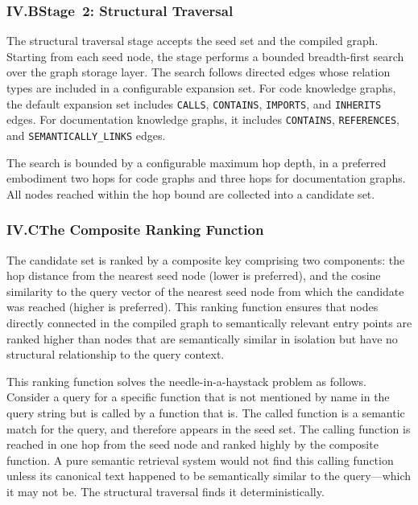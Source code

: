 \documentclass[12pt]{article}
\begin{document}
\subsubsection{IV.B\quad Stage~2: Structural Traversal}

The structural traversal stage accepts the seed set and the compiled graph.
Starting from each seed node, the stage performs a bounded breadth-first search
over the graph storage layer. The search follows directed edges whose relation
types are included in a configurable expansion set. For code knowledge graphs,
the default expansion set includes \texttt{CALLS}, \texttt{CONTAINS},
\texttt{IMPORTS}, and \texttt{INHERITS} edges. For documentation knowledge
graphs, it includes \texttt{CONTAINS}, \texttt{REFERENCES}, and
\texttt{SEMANTICALLY\_LINKS} edges.

The search is bounded by a configurable maximum hop depth, in a preferred
embodiment two hops for code graphs and three hops for documentation graphs. All
nodes reached within the hop bound are collected into a candidate set.

\subsubsection{IV.C\quad The Composite Ranking Function}

The candidate set is ranked by a composite key comprising two components: the hop
distance from the nearest seed node (lower is preferred), and the cosine
similarity to the query vector of the nearest seed node from which the candidate
was reached (higher is preferred). This ranking function ensures that nodes
directly connected in the compiled graph to semantically relevant entry points
are ranked higher than nodes that are semantically similar in isolation but have
no structural relationship to the query context.

This ranking function solves the needle-in-a-haystack problem as follows.
Consider a query for a specific function that is not mentioned by name in the
query string but is called by a function that is. The called function is a
semantic match for the query, and therefore appears in the seed set. The calling
function is reached in one hop from the seed node and ranked highly by the
composite function. A pure semantic retrieval system would not find this calling
function unless its canonical text happened to be semantically similar to the
query---which it may not be. The structural traversal finds it deterministically.
\end{document}
